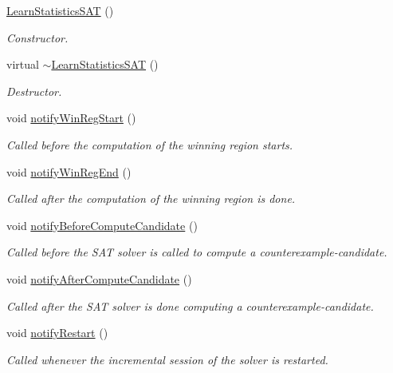 \begin{DoxyCompactItemize}
\item 
\hyperlink{classLearnStatisticsSAT_af7e87ab9cc1a82e5775fbf49b5edb532}{Learn\-Statistics\-S\-A\-T} ()
\begin{DoxyCompactList}\small\item\em Constructor. \end{DoxyCompactList}\item 
virtual \hyperlink{classLearnStatisticsSAT_a0296238cfd7a8e1d50b1694427fc6863}{$\sim$\-Learn\-Statistics\-S\-A\-T} ()
\begin{DoxyCompactList}\small\item\em Destructor. \end{DoxyCompactList}\item 
void \hyperlink{classLearnStatisticsSAT_ae75ccaa0f80d08aebfc98a953e997579}{notify\-Win\-Reg\-Start} ()
\begin{DoxyCompactList}\small\item\em Called before the computation of the winning region starts. \end{DoxyCompactList}\item 
void \hyperlink{classLearnStatisticsSAT_aef1a7fa18629a82aacde388741a2534c}{notify\-Win\-Reg\-End} ()
\begin{DoxyCompactList}\small\item\em Called after the computation of the winning region is done. \end{DoxyCompactList}\item 
void \hyperlink{classLearnStatisticsSAT_aed53fb25ba247b25f867df76a71c95dd}{notify\-Before\-Compute\-Candidate} ()
\begin{DoxyCompactList}\small\item\em Called before the S\-A\-T solver is called to compute a counterexample-\/candidate. \end{DoxyCompactList}\item 
void \hyperlink{classLearnStatisticsSAT_a4bebe07e8978f3866867ecf7ef432035}{notify\-After\-Compute\-Candidate} ()
\begin{DoxyCompactList}\small\item\em Called after the S\-A\-T solver is done computing a counterexample-\/candidate. \end{DoxyCompactList}\item 
void \hyperlink{classLearnStatisticsSAT_aecd9d61c097ec9209a19ee7dee5feff2}{notify\-Restart} ()
\begin{DoxyCompactList}\small\item\em Called whenever the incremental session of the solver is restarted. \end{DoxyCompactList}\item 

\end{DoxyCompactItemize}

